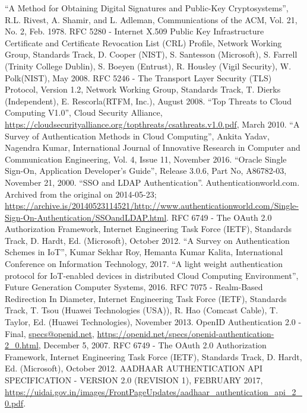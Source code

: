 \begin{multicols}{2}
\begin{thebibliography}{99}
 ``A Method for Obtaining Digital Signatures and Public-Key Cryptosystems'', R.L. Rivest, A. Shamir, and L. Adleman, Communications of the ACM, Vol. 21, No. 2, Feb. 1978.
 RFC 5280 - Internet X.509 Public Key Infrastructure Certificate and Certificate Revocation List (CRL) Profile, Network Working Group, Standards Track, D. Cooper (NIST), S. Santesson (Microsoft), S. Farrell (Trinity College Dublin), S. Boeyen (Entrust), R. Housley (Vigil Security), W. Polk(NIST), May 2008.
 RFC 5246 - The Transport Layer Security (TLS) Protocol, Version 1.2, Network Working Group, Standards Track, T. Dierks (Independent), E. Rescorla(RTFM, Inc.), August 2008.
 ``Top Threats to Cloud Computing V1.0'', Cloud Security Alliance, \url{https://cloudsecurityalliance.org/topthreats/csathreats.v1.0.pdf}, March 2010.
 ``A Survey of Authentication Methods in Cloud Computing'', Ankita Yadav, Nagendra Kumar, International Journal of Innovative Research in Computer and Communication Engineering, Vol. 4, Issue 11, November 2016.
 ``Oracle Single Sign-On, Application Developer's Guide'', Release 3.0.6, Part No, A86782-03, November 21, 2000.
 ``SSO and LDAP Authentication''. Authenticationworld.com. Archived from the original on 2014-05-23; \url{https://archive.is/20140523114521/http://www.authenticationworld.com/Single-Sign-On-Authentication/SSOandLDAP.html}.
 RFC 6749 - The OAuth 2.0 Authorization Framework, Internet Engineering Task Force (IETF), Standards Track, D. Hardt, Ed. (Microsoft), October 2012.
 ``A Survey on Authentication Schemes in IoT'', Kumar Sekhar Roy, Hemanta Kumar Kalita, International Conference on Information Technology, 2017.
 ``A light weight authentication protocol for IoT-enabled devices in distributed Cloud Computing Environment'', Future Generation Computer Systems, 2016.
 RFC 7075 - Realm-Based Redirection In Diameter, Internet Engineering Task Force (IETF), Standards Track, T. Tsou (Huawei Technologies (USA)), R. Hao (Comcast Cable), T. Taylor, Ed. (Huawei Technologies), November 2013.
 OpenID Authentication 2.0 - Final, \url{specs@openid.net}, \url{https://openid.net/specs/openid-authentication-2_0.html}, December 5, 2007.
 RFC 6749 - The OAuth 2.0 Authorization Framework, Internet Engineering Task Force (IETF), Standards Track, D. Hardt, Ed. (Microsoft), October 2012.
 AADHAAR AUTHENTICATION API SPECIFICATION - VERSION 2.0 (REVISION 1), FEBRUARY 2017, \url{https://uidai.gov.in/images/FrontPageUpdates/aadhaar_authentication_api_2_0.pdf}.
\end{thebibliography}
\end{multicols}

